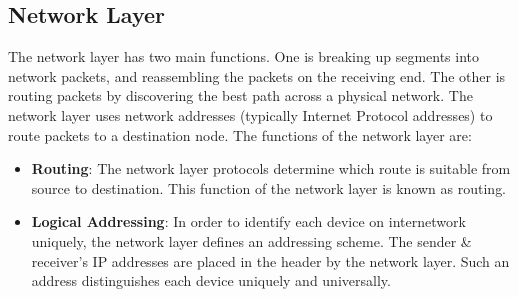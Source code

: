 \documentclass{article}
\begin{document}
    \subsection{Network Layer}
    The network layer has two main functions. One is breaking up segments into network packets, and reassembling the packets on the receiving end. The other is routing packets by discovering the best path across a physical network. The network layer uses network addresses (typically Internet Protocol addresses) to route packets to a destination node.
    The functions of the network layer are:
    \begin{itemize}
        \item \textbf{Routing}: The network layer protocols determine which route is suitable from source to destination. This function of the network layer is known as routing.
        \item \textbf{Logical Addressing}: In order to identify each device on internetwork uniquely, the network layer defines an addressing scheme. The sender \& receiver’s IP addresses are placed in the header by the network layer. Such an address distinguishes each device uniquely and universally.
    \end{itemize}
\end{document}
